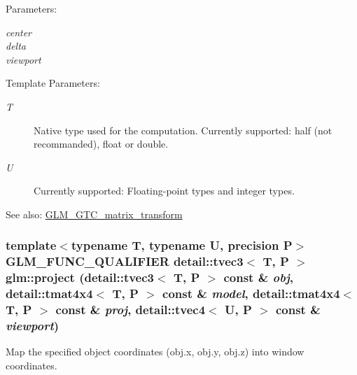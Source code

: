 \begin{Desc}
\item[Parameters:]
\begin{description}
\item[{\em center}]\item[{\em delta}]\item[{\em viewport}]\end{description}
\end{Desc}
\begin{Desc}
\item[Template Parameters:]
\begin{description}
\item[{\em T}]Native type used for the computation. Currently supported: half (not recommanded), float or double. \item[{\em U}]Currently supported: Floating-point types and integer types. \end{description}
\end{Desc}
\begin{Desc}
\item[See also:]\hyperlink{group__gtc__matrix__transform}{GLM\_\-GTC\_\-matrix\_\-transform} \end{Desc}
\hypertarget{group__gtc__matrix__transform_ge6de64f8b0a55befb0e296475c6f0c79}{
\subsubsection[project]{\setlength{\rightskip}{0pt plus 5cm}template$<$typename T, typename U, precision P$>$ GLM\_\-FUNC\_\-QUALIFIER detail::tvec3$<$ T, P $>$ glm::project (detail::tvec3$<$ T, P $>$ const \& {\em obj}, \/  detail::tmat4x4$<$ T, P $>$ const \& {\em model}, \/  detail::tmat4x4$<$ T, P $>$ const \& {\em proj}, \/  detail::tvec4$<$ U, P $>$ const \& {\em viewport})}}
\label{group__gtc__matrix__transform_ge6de64f8b0a55befb0e296475c6f0c79}


Map the specified object coordinates (obj.x, obj.y, obj.z) into window coordinates.

